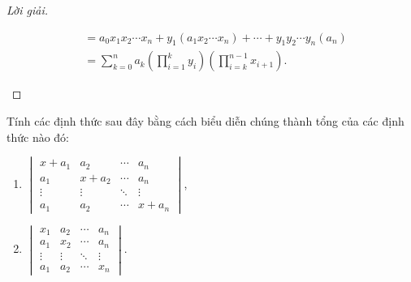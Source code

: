 \documentclass[class=linearalgebra,crop=false]{standalone}
\begin{document}
\begin{proof}[Lời giải]
\begin{enumerate}[label = (\alph*)]
\begin{align*}
                   & = a_{0}x_{1}x_{2}\cdots x_{n}
                  + y_{1} (a_{1}x_{2}\cdots x_{n})
                  + \cdots
                  + y_{1}y_{2}\cdots y_{n} (a_{n})                                                                   \\
                   & = \sum^{n}_{k=0} a_{k}\left(\prod^{k}_{i=1}y_{i}\right)\left(\prod^{n-1}_{i=k}x_{i + 1}\right).
              \end{align*}
    \end{enumerate}
\end{proof}

\begin{exercise}
    Tính các định thức sau đây bằng cách biểu diễn chúng thành tổng của các định thức nào đó:
    \begin{enumerate}[label = (\alph*)]
        \item $\begin{vmatrix}
                      x + a_{1} & a_{2}     & \cdots & a_{n}     \\
                      a_{1}     & x + a_{2} & \cdots & a_{n}     \\
                      \vdots    & \vdots    & \ddots & \vdots    \\
                      a_{1}     & a_{2}     & \cdots & x + a_{n}
                  \end{vmatrix}$,
        \item $\begin{vmatrix}
                      x_{1}  & a_{2}  & \cdots & a_{n}  \\
                      a_{1}  & x_{2}  & \cdots & a_{n}  \\
                      \vdots & \vdots & \ddots & \vdots \\
                      a_{1}  & a_{2}  & \cdots & x_{n}
                  \end{vmatrix}$.
    \end{enumerate}
\end{exercise}
\end{document}
